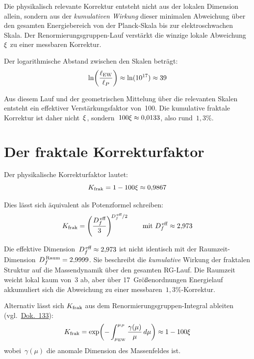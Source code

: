 Die physikalisch relevante Korrektur entsteht nicht aus der lokalen Dimension allein, sondern aus der \emph{kumulativen Wirkung} dieser minimalen Abweichung über den gesamten Energiebereich von der Planck-Skala bis zur elektroschwachen Skala. Der Renormierungsgruppen-Lauf verstärkt die winzige lokale Abweichung~$\xi$ zu einer messbaren Korrektur.

Der logarithmische Abstand zwischen den Skalen beträgt:
\begin{equation}
\ln\!\left(\frac{\ell_{\text{EW}}}{\ell_P}\right) \approx \ln(10^{17}) \approx 39
\end{equation}

Aus diesem Lauf und der geometrischen Mittelung über die relevanten Skalen entsteht ein effektiver Verstärkungsfaktor von~100. Die kumulative fraktale Korrektur ist daher nicht~$\xi$, sondern~$100\xi \approx 0{,}0133$, also rund~$1{,}3\%$.

\section{Der fraktale Korrekturfaktor}

Der physikalische Korrekturfaktor lautet:
\begin{equation}
K_{\text{frak}} = 1 - 100\xi \approx 0{,}9867
\end{equation}

Dies lässt sich äquivalent als Potenzformel schreiben:
\begin{equation}
K_{\text{frak}} = \left(\frac{D_f^{\,\text{eff}}}{3}\right)^{\!D_f^{\,\text{eff}}/2} \qquad \text{mit } D_f^{\,\text{eff}} \approx 2{,}973
\end{equation}

Die effektive Dimension~$D_f^{\,\text{eff}} \approx 2{,}973$ ist nicht identisch mit der Raumzeit-Dimension~$D_f^{\,\text{Raum}} = 2{,}9999$. Sie beschreibt die \emph{kumulative} Wirkung der fraktalen Struktur auf die Massendynamik über den gesamten RG-Lauf. Die Raumzeit weicht lokal kaum von~3 ab, aber über 17~Größenordnungen Energielauf akkumuliert sich die Abweichung zu einer messbaren~$1{,}3\%$-Korrektur.

Alternativ lässt sich $K_{\text{frak}}$ aus dem Renormierungsgruppen-Integral ableiten (vgl.\ \href{https://github.com/jpascher/T0-Time-Mass-Duality/blob/main/2/pdf/133_Fraktale_Korrektur_Herleitung_De.pdf}{Dok.~133}):
\begin{equation}
K_{\text{frak}} = \exp\!\left(-\int_{\mu_{\text{EW}}}^{\mu_P} \frac{\gamma(\mu)}{\mu}\,d\mu\right) \approx 1 - 100\xi
\end{equation}
wobei~$\gamma(\mu)$ die anomale Dimension des Massenfeldes ist.


